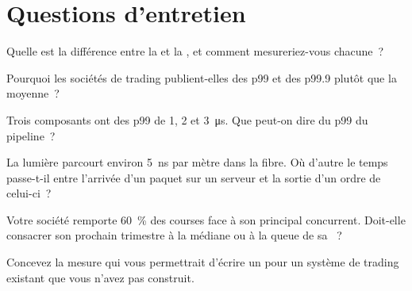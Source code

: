 \section{Questions d'entretien}

\begin{interviewq}\label{iq:ll:where-latency-comes-from:1}
Quelle est la différence entre la  et la , et comment mesureriez-vous chacune~?
\end{interviewq}

\begin{interviewq}\label{iq:ll:where-latency-comes-from:2}
Pourquoi les sociétés de trading publient-elles des p99 et des p99.9 plutôt que la  moyenne~?
\end{interviewq}

\begin{interviewq}\label{iq:ll:where-latency-comes-from:3}
Trois composants ont des  p99 de 1, 2 et \qty{3}{\micro\second}. Que peut-on dire du p99 du
pipeline~?
\end{interviewq}

\begin{interviewq}\label{iq:ll:where-latency-comes-from:4}
La lumière parcourt environ \qty{5}{\nano\second} par mètre dans la fibre. Où d'autre le temps passe-t-il entre l'arrivée d'un paquet
sur un serveur et la sortie d'un ordre de celui-ci~?
\end{interviewq}

\begin{interviewq}\label{iq:ll:where-latency-comes-from:5}
Votre société remporte 60~\% des courses face à son principal concurrent. Doit-elle consacrer son prochain trimestre à la médiane ou
à la queue de sa ~?
\end{interviewq}

\begin{interviewq}\label{iq:ll:where-latency-comes-from:6}
Concevez la mesure qui vous permettrait d'écrire un  pour un système de trading existant que vous n'avez pas construit.
\end{interviewq}
